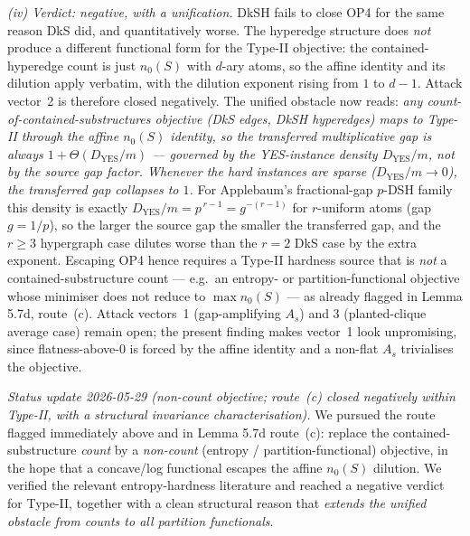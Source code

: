 \documentclass[
]{article}
\begin{document}
\emph{(iv) Verdict: negative, with a unification.} DkSH fails to close
OP4 for the same reason DkS did, and quantitatively worse. The hyperedge
structure does \emph{not} produce a different functional form for the
Type-II objective: the contained-hyperedge count is just $n_0(S)$ with
$d$-ary atoms, so the affine identity and its dilution apply verbatim,
with the dilution exponent rising from $1$ to $d-1$. Attack vector~2 is
therefore closed negatively. The unified obstacle now reads: \emph{any
count-of-contained-substructures objective (DkS edges, DkSH hyperedges)
maps to Type-II through the affine $n_0(S)$ identity, so the transferred
multiplicative gap is always $1+\Theta(D_{\mathrm{YES}}/m)$ --- governed
by the YES-instance \emph{density} $D_{\mathrm{YES}}/m$, not by the source
gap factor. Whenever the hard instances are sparse ($D_{\mathrm{YES}}/m
\to 0$), the transferred gap collapses to $1$.} For Applebaum's
fractional-gap $p$-DSH family this density is exactly
$D_{\mathrm{YES}}/m=p^{\,r-1}=g^{-(r-1)}$ for $r$-uniform atoms (gap
$g=1/p$), so the larger the source gap the smaller the transferred gap,
and the $r\ge 3$ hypergraph case dilutes worse than the $r=2$ DkS case
by the extra exponent. Escaping OP4 hence requires a Type-II hardness
source that is \emph{not} a contained-substructure count --- e.g.\ an
entropy- or partition-functional objective whose minimiser does not
reduce to $\max n_0(S)$ --- as already flagged in Lemma 5.7d, route~(c).
Attack vectors~1 (gap-amplifying $A_s$) and 3 (planted-clique average
case) remain open; the present finding makes vector~1 look unpromising,
since flatness-above-$0$ is forced by the affine identity and a non-flat
$A_s$ trivialises the objective.

\emph{Status update 2026-05-29 (non-count objective; route~(c) closed
negatively \emph{within} Type-II, with a structural invariance
characterisation).} We pursued the route flagged immediately above and in
Lemma 5.7d route~(c): replace the contained-substructure \emph{count} by a
\emph{non-count} (entropy / partition-functional) objective, in the hope
that a concave/log functional escapes the affine $n_0(S)$ dilution. We
verified the relevant entropy-hardness literature and reached a negative
verdict for Type-II, together with a clean structural reason that
\emph{extends the unified obstacle from counts to all partition
functionals}.
\end{document}
